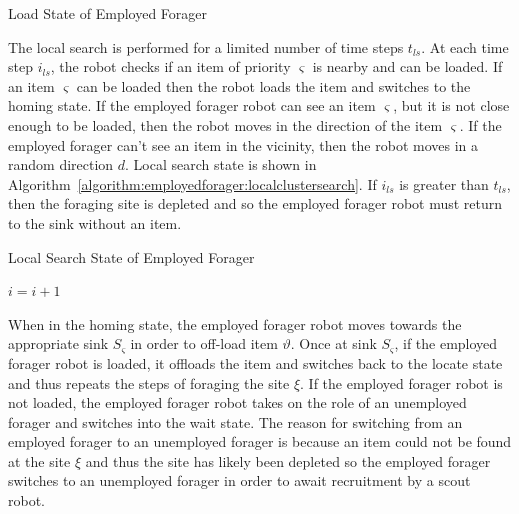 \begin{algorithm}
\caption{Load State of Employed Forager}
\label{algorithm:loading}
\begin{algorithmic}[1]
	\State {}
\Else
\EndIf
\EndFunction
\end{algorithmic}
\end{algorithm}

The local search is performed for a limited number of time steps $t_{ls}$. At each time step $i_{ls}$, the robot checks if an item of priority $\varsigma$ is nearby and can be loaded. If an item $\varsigma$ can be loaded then the robot loads the item and switches to the homing state. If the employed forager robot can see an item $\varsigma$, but it is not close enough to be loaded, then the robot moves in the direction of the item $\varsigma$. If the employed forager can't see an item in the vicinity, then the robot moves in a random direction $d$. Local search state is shown in Algorithm~\ref{algorithm:employedforager:localclustersearch}. If $i_{ls}$ is greater than $t_{ls}$, then the foraging site is depleted and so the employed forager robot must return to the sink without an item.

\begin{algorithm}
\caption{Local Search State of Employed Forager}
\label{algorithm:employedforager:localclustersearch}
\begin{algorithmic}[1]
			\State {}
			\State {}
			\State {}
		\Else
			\State {}
			\State {}	
		\EndIf
\Else
\EndIf
\State $i =i + 1$
\EndFunction
\end{algorithmic}
\end{algorithm}

When in the homing state, the employed forager robot moves towards the appropriate sink $S_\varsigma$ in order to off-load item $\vartheta$. Once at sink $S_\varsigma$, if the employed forager robot is loaded, it offloads the item and switches back to the locate state and thus repeats the steps of foraging the site $\xi$. If the employed forager robot is not loaded, the employed forager robot takes on the role of an unemployed forager and switches into the wait state. The reason for switching from an employed forager to an unemployed forager is because an item could not be found at the site $\xi$ and thus the site has likely been depleted so the employed forager switches to an unemployed forager in order to await recruitment by a scout robot.

